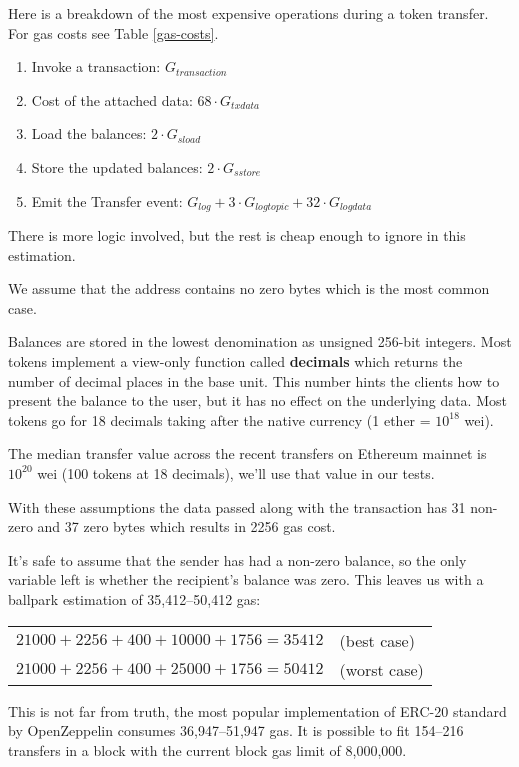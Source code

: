 \documentclass[12pt]{article}
\begin{document}
Here is a breakdown of the most expensive operations during a token transfer. For gas costs see Table \ref{gas-costs}.

\begin{enumerate}
	\item Invoke a transaction: $G_{transaction}$
	\item Cost of the attached data: $68 \cdot G_{txdata}$
	\item Load the balances: $2 \cdot G_{sload}$
	\item Store the updated balances: $2 \cdot G_{sstore}$
	\item Emit the Transfer event: $G_{log} + 3 \cdot G_{logtopic} + 32 \cdot G_{logdata}$
\end{enumerate}

There is more logic involved, but the rest is cheap enough to ignore in this estimation.

We assume that the address contains no zero bytes which is the most common case.

Balances are stored in the lowest denomination as unsigned 256-bit integers.
Most tokens implement a view-only function called \textbf{decimals} which returns the number of decimal places in the base unit.
This number hints the clients how to present the balance to the user, but it has no effect on the underlying data.
Most tokens go for 18 decimals taking after the native currency (1 ether = $10^{18}$ wei).

The median transfer value across the recent transfers on Ethereum mainnet is $10^{20}$ wei (100 tokens at 18 decimals), we'll use that value in our tests.

With these assumptions the data passed along with the transaction has 31 non-zero and 37 zero bytes which results in 2256 gas cost.

It's safe to assume that the sender has had a non-zero balance, so the only variable left is whether the recipient's balance was zero. This leaves us with a ballpark estimation of 35,412--50,412 gas:
\begin{center}
	\begin{tabular}{l l}
		$21000 + 2256 + 400 + 10000 + 1756 = 35412$ & (best case) \\
		$21000 + 2256 + 400 + 25000 + 1756 = 50412$ & (worst case) \\
	\end{tabular}
\end{center}
%
This is not far from truth, the most popular implementation of ERC-20 standard by  OpenZeppelin\cite{openzeppelin} consumes 36,947--51,947 gas.
It is possible to fit 154--216 transfers in a block with the current block gas limit of  8,000,000.
\end{document}
